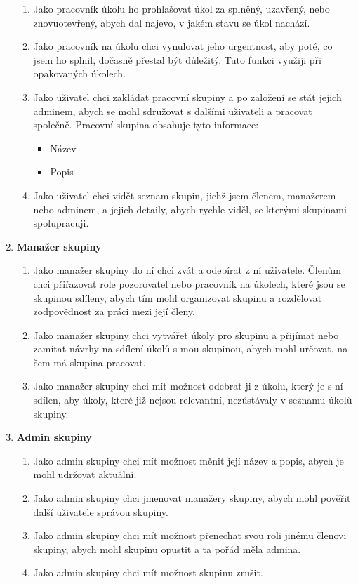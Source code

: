 \documentclass[thesis=B,czech]{FITthesis}[2012/06/26]
\begin{document}
\begin{enumerate}
\begin{enumerate}
				\item Jako pracovník úkolu ho prohlašovat úkol za splněný, uzavřený, nebo znovuotevřený, abych dal najevo, v jakém stavu se úkol nachází.
				
				\item Jako pracovník na  úkolu chci vynulovat jeho urgentnost, aby poté, co jsem ho splnil, dočasně přestal být důležitý. Tuto funkci využiji při opakovaných úkolech.
				
				\item Jako uživatel chci zakládat pracovní skupiny a po založení se stát jejich adminem, abych se mohl sdružovat s dalšími uživateli a pracovat společně. Pracovní skupina obsahuje tyto informace:
				\begin{itemize}
					\item Název
					\item Popis
				\end{itemize}
				
				\item Jako uživatel chci vidět seznam skupin, jichž jsem členem, manažerem nebo adminem, a jejich detaily, abych rychle viděl, se kterými skupinami spolupracuji.
			\end{enumerate}
			
			
			\item \textbf{Manažer skupiny}
			\begin{enumerate}
				\item Jako manažer skupiny do ní chci zvát a odebírat z ní uživatele. Členům chci přiřazovat role pozorovatel nebo pracovník na úkolech, které jsou se skupinou sdíleny, abych tím mohl organizovat skupinu a rozdělovat zodpovědnost za práci mezi její členy. 
				
				\item Jako manažer skupiny chci vytvářet úkoly pro skupinu a přijímat nebo zamítat návrhy na sdílení úkolů s mou skupinou, abych mohl určovat, na čem má skupina pracovat.
				
				\item Jako manažer skupiny chci mít možnost odebrat ji z úkolu, který je s ní sdílen, aby úkoly, které již nejsou relevantní, nezůstávaly v seznamu úkolů skupiny.
			\end{enumerate}
			
			
			\item \textbf{Admin skupiny}
			\begin{enumerate}
				\item Jako admin skupiny chci mít možnost měnit její název a popis, abych je mohl udržovat aktuální.
				\item Jako admin skupiny chci jmenovat manažery skupiny, abych mohl pověřit další uživatele správou skupiny.
				\item Jako admin skupiny chci mít možnost přenechat svou roli jinému členovi skupiny, abych mohl skupinu opustit a ta pořád měla admina.
				\item Jako admin skupiny chci mít možnost skupinu zrušit.
			\end{enumerate}
		\end{enumerate}	
		
\end{document}
